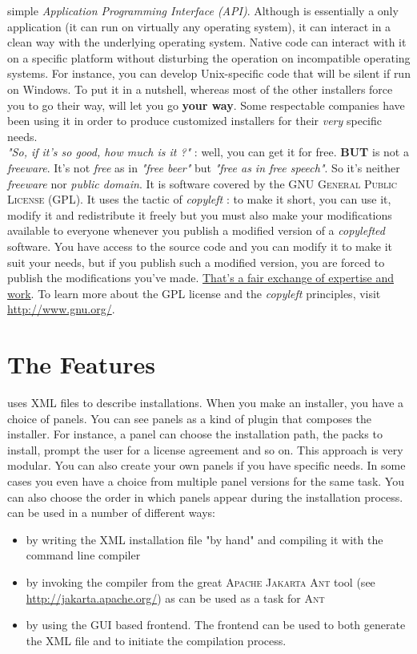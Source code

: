 simple \textit{Application Programming Interface (API)}. Although
\IzPack is essentially a \Java only application (it can run on virtually
any operating system), it can interact in a clean way with the
underlying operating system. Native code can interact with it on a
specific platform without disturbing the operation on incompatible
operating systems. For instance, you can develop Unix-specific code that
will be silent if run on Windows. To put it in a nutshell, whereas most
of the other \Java installers force you to go their way, \IzPack will
let you go \textbf{your way}. Some respectable companies have been using
it in order to produce customized  installers for their \textsl{very}
specific needs.\\

\textit{"So, if it's so good, how much is it ?"} : well, you can get it
for free. \textbf{BUT} \IzPack is not a \textit{freeware}. It's not
\textit{free} as in \textit{"free beer"} but \textit{"free as in free
speech"}. So it's neither \textit{freeware} nor \textit{public domain}.
It is software covered by the \textsc{GNU General Public License} (GPL).
It uses the tactic of \textit{copyleft} : to make it short, you can use
it, modify it and redistribute it freely but you must also make your
modifications available to everyone whenever you publish a modified
version of a \textit{copylefted} software. You have access to the
\IzPack source code and you can modify it to make it suit your needs,
but if you publish such a modified version, you are forced to publish
the modifications you've made. \underline{That's a fair exchange of
expertise and  work}. To learn more about the GPL license and the
\textit{copyleft} principles, visit \mbox{\url{http://www.gnu.org/}}.\\

\section*{The Features}

\IzPack uses XML files to describe installations. When you make an
installer, you have a choice of panels. You can see panels as a kind of
plugin that composes the installer. For instance, a panel can choose the
installation path, the packs to install, prompt the user for a license
agreement and so on. This approach is very modular. You can also create
your own panels if you have specific needs. In some cases you even have
a choice from multiple panel versions for the same task. You can also
choose the order in which panels appear during the installation process.
\IzPack can be used in a number of different ways:
\begin{itemize}
  \item by writing the XML installation file "by hand" and compiling
  it with the command line compiler
  \item by invoking the compiler from the great \textsc{Apache Jakarta
  Ant} tool (see \url{http://jakarta.apache.org/}) as \IzPack can be
  used as a task for \textsc{Ant}
  \item by using the GUI based frontend. The frontend can be used to
  both generate the XML file and to initiate the compilation process.
\end{itemize}\

